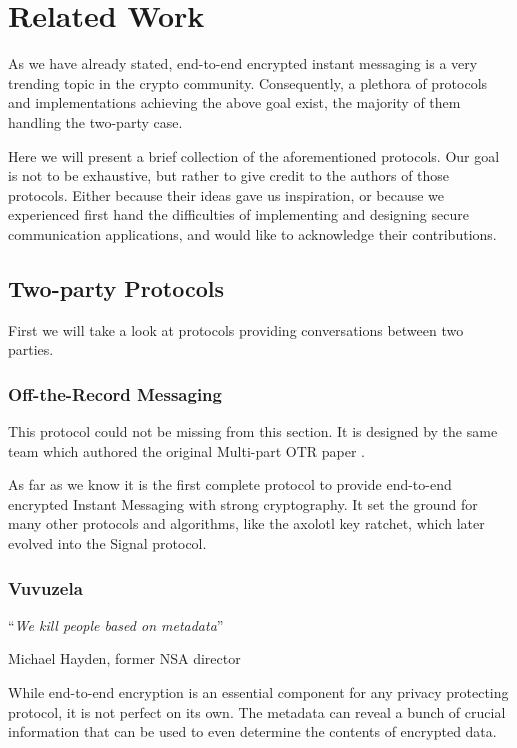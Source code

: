 \chapter{Related Work}
\label{chapter:related_work}

As we have already stated, end-to-end encrypted instant messaging is a very trending topic in  the crypto community.
Consequently, a plethora of protocols and implementations achieving the above goal exist, the majority of them handling the two-party case.

Here we will present a brief collection of the aforementioned protocols.
Our goal is not to be exhaustive, but rather to give credit to the authors of those protocols.
Either because their ideas gave us inspiration, or because we experienced first hand the difficulties of implementing and designing secure communication applications, and would like to acknowledge their contributions.

\section{Two-party Protocols}

First we will take a look at protocols providing conversations between two parties.

\subsection{Off-the-Record Messaging}

This protocol could not be missing from this section.
It is designed by the same team which authored the original Multi-part OTR paper \cite{mpotr}.

As far as we know it is the first complete protocol to provide end-to-end encrypted Instant Messaging with strong cryptography.
It set the ground for many other protocols and algorithms, like the axolotl key ratchet, which later evolved into the Signal protocol.

\subsection{Vuvuzela}

\noindent\enquote{\itshape We kill people based on metadata}\bigbreak

\hfill {\small Michael Hayden, former NSA director}
\bigbreak

While end-to-end encryption is an essential component for any privacy protecting protocol, it is not perfect on its own.
The metadata can reveal a bunch of crucial information that can be used to even determine the contents of encrypted data.

